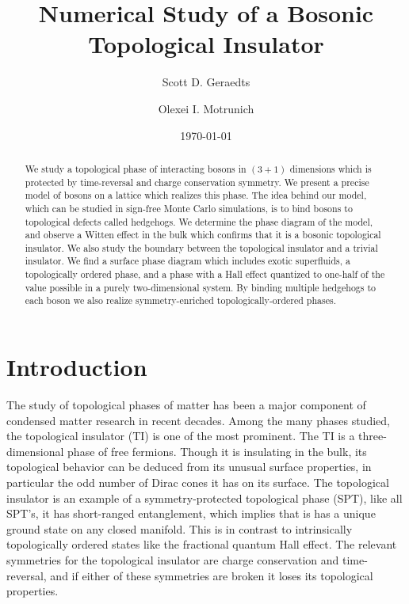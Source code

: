 \documentclass[prb,twocolumn]{revtex4-1}
\begin{document}
\title{Numerical Study of a Bosonic Topological Insulator}
\date{\today}
\pacs{}

\author{Scott D. Geraedts}
\author{Olexei I. Motrunich}

\begin{abstract}
We study a topological phase of interacting bosons in $(3+1)$ dimensions which is protected by time-reversal and charge conservation symmetry. We present a precise model of bosons on a lattice which realizes this phase. The idea behind our model, which can be studied in sign-free Monte Carlo simulations, is to bind bosons to topological defects called hedgehogs. We determine the phase diagram of the model, and observe a Witten effect in the bulk which confirms that it is a bosonic topological insulator. We also study the boundary between the topological insulator and a trivial insulator. We find a surface phase diagram which includes exotic superfluids, a topologically ordered phase, and a phase with a Hall effect quantized to one-half of the value possible in a purely two-dimensional system. By binding multiple hedgehogs to each boson we also realize symmetry-enriched topologically-ordered phases.
\end{abstract}
\maketitle

\section{Introduction}
The study of topological phases of matter has been a major component of condensed matter research in recent decades. Among the many phases studied, the topological insulator (TI) is one of the most prominent. The TI is a three-dimensional phase of free fermions. Though it is insulating in the bulk, its topological behavior can be deduced from its unusual surface properties, in particular the odd number of Dirac cones it has on its surface. The topological insulator is an example of a symmetry-protected topological phase (SPT), like all SPT's, it has short-ranged entanglement, which implies that is has a unique ground state on any closed manifold. This is in contrast to intrinsically topologically ordered states like the fractional quantum Hall effect. The relevant symmetries for the topological insulator are charge conservation and time-reversal, and if either of these symmetries are broken it loses its topological properties.
\end{document}
